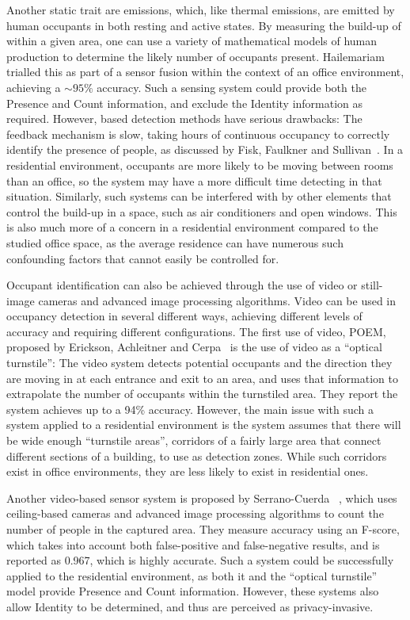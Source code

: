 \documentclass[../thesis/thesis.tex]{subfiles}
\begin{document}
Another static trait are \cdi emissions, which, like thermal emissions, are emitted by human occupants in both resting and active states. By measuring the build-up of \cdi within a given area, one can use a variety of mathematical models of human \cdi production to determine the likely number of occupants present. Hailemariam \etal~\cite{hailemariam2011real} trialled this as part of a sensor fusion within the context of an office environment, achieving a $\sim95\%$ accuracy. Such a sensing system could provide both the Presence and Count information, and exclude the Identity information as required. However, \cdi based detection methods have serious drawbacks: The \cdi feedback mechanism is slow, taking hours of continuous occupancy to correctly identify the presence of people, as discussed by Fisk, Faulkner and Sullivan~\cite{fisk2006accuracy}. In a residential environment, occupants are more likely to be moving between rooms than an office, so the system may have a more difficult time detecting in that situation. Similarly, such systems can be interfered with by other elements that control the \cdi build-up in a space, such as air conditioners and open windows. This is also much more of a concern in a residential environment compared to the studied office space, as the average residence can have numerous such confounding factors that cannot easily be controlled for.

Occupant identification can also be achieved through the use of video or still-image cameras and advanced image processing algorithms. Video can be used in occupancy detection in several different ways, achieving different levels of accuracy and requiring different configurations. The first use of video, POEM, proposed by Erickson, Achleitner and Cerpa~\cite{erickson2013poem} is the use of video as a ``optical turnstile'': The video system detects potential occupants and the direction they are moving in at each entrance and exit to an area, and uses that information to extrapolate the number of occupants within the turnstiled area. They report the system achieves up to a 94\% accuracy. However, the main issue with such a system applied to a residential environment is the system assumes that there will be wide enough ``turnstile areas'', corridors of a fairly large area that connect different sections of a building, to use as detection zones. While such corridors exist in office environments, they are less likely to exist in residential ones.

Another video-based sensor system is proposed by Serrano-Cuerda \etal~\cite{serrano2013efficient}, which uses ceiling-based cameras and advanced image processing algorithms to count the number of people in the captured area. They measure accuracy using an F-score, which takes into account both false-positive and false-negative results, and is reported as 0.967, which is highly accurate. Such a system could be successfully applied to the residential environment, as both it and the ``optical turnstile'' model provide Presence and Count information. However, these systems also allow Identity to be determined, and thus are perceived as privacy-invasive.
\end{document}
